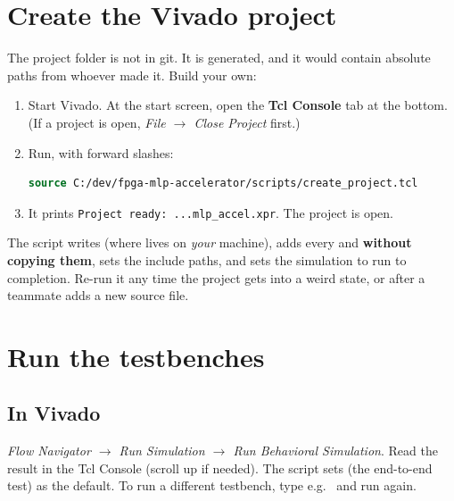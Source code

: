 \documentclass[11pt]{article}
\begin{document}
\section{Create the Vivado project}\label{sec:proj}
The project folder  is not in git. It is generated, and it would
contain absolute paths from whoever made it. Build your own:
\begin{enumerate}
  \item Start Vivado. At the start screen, open the \textbf{Tcl Console} tab at the bottom.
        (If a project is open, \emph{File $\rightarrow$ Close Project} first.)
  \item Run, with forward slashes:
\begin{lstlisting}[language=tcl]
source C:/dev/fpga-mlp-accelerator/scripts/create_project.tcl
\end{lstlisting}
  \item It prints \texttt{Project ready: ...mlp\_accel.xpr}. The project is open.
\end{enumerate}
The script writes  (where  lives on
\emph{your} machine), adds every  and 
\textbf{without copying them}, sets the include paths, and sets the simulation to
run to completion. Re-run it any time the project gets into a weird state, or
after a teammate adds a new source file.

\section{Run the testbenches}

\subsection{In Vivado}
\emph{Flow Navigator $\rightarrow$ Run Simulation $\rightarrow$ Run Behavioral
Simulation}. Read the result in the Tcl Console (scroll up if needed). The
script sets  (the end-to-end test) as the default. To run a
different testbench, type e.g.\
 and run again.
\end{document}
